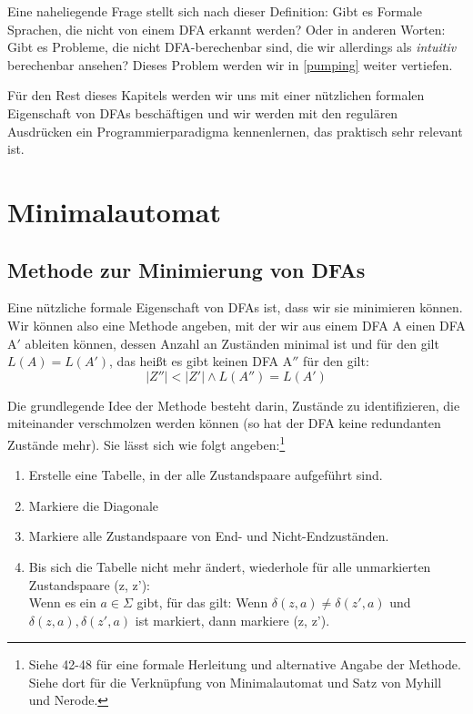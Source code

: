 Eine naheliegende Frage stellt sich nach dieser Definition:
Gibt es Formale Sprachen, die nicht von einem DFA erkannt werden?
Oder in anderen Worten: Gibt es Probleme, die nicht DFA-berechenbar sind,
die wir allerdings als \emph{intuitiv} berechenbar ansehen?
Dieses Problem werden wir in \autoref{pumping} weiter vertiefen.

Für den Rest dieses Kapitels
werden wir uns mit einer nützlichen formalen Eigenschaft von DFAs beschäftigen
und wir werden mit den regulären Ausdrücken ein Programmierparadigma kennenlernen,
das praktisch sehr relevant ist.

\section{Minimalautomat}

\subsection{Methode zur Minimierung von DFAs}

Eine nützliche formale Eigenschaft von DFAs ist,
dass wir sie minimieren können.
Wir können also eine Methode angeben,
mit der wir aus einem DFA A einen DFA A$'$ ableiten können,
dessen Anzahl an Zuständen minimal ist 
und für den gilt $L(A) = L(A')$,
das heißt es gibt keinen DFA A$''$ für den gilt:
\[|Z''| < |Z'| \wedge L(A'') = L(A') \]

Die grundlegende Idee der Methode besteht darin,
Zustände zu identifizieren,
die miteinander verschmolzen werden können
(so hat der DFA keine redundanten Zustände mehr).
Sie lässt sich wie folgt angeben:\footnote{
    Siehe \cite{schoening} 42-48
    für eine formale Herleitung und alternative Angabe der Methode.
    Siehe dort für die Verknüpfung von Minimalautomat und Satz von Myhill und Nerode.}

\begin{enumerate}
    \item Erstelle eine Tabelle, in der alle Zustandspaare aufgeführt sind.
    \item Markiere die Diagonale 
    \item Markiere alle Zustandspaare von End- und Nicht-Endzuständen.
    \item Bis sich die Tabelle nicht mehr ändert,
        wiederhole für alle unmarkierten Zustandspaare (z, z'):\\
        Wenn es ein $a \in \Sigma$ gibt,
        für das gilt:
        Wenn $\delta(z,a) \neq \delta(z',a)$ und $\delta(z,a), \delta(z',a)$ ist markiert,
        dann markiere (z, z').
\end{enumerate}

